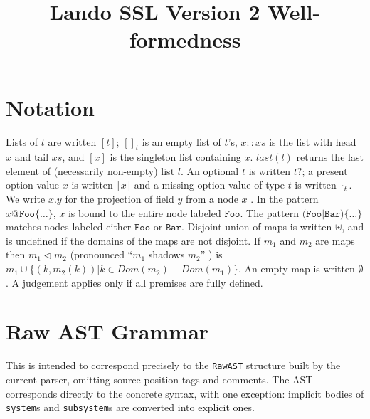 \documentclass{article}
\begin{document}
\title{Lando SSL Version 2 Well-formedness}
\maketitle

\section{Notation}

\newcommand{\nt}[1]{\ensuremath{\mathit{#1}}}
\newcommand{\lab}[1]{\ensuremath{\texttt{#1}}}
\newcommand{\listof}[1]{\ensuremath{[{#1}]}}
\newcommand{\nillist}[1]{[]_{#1}}
\newcommand{\conslist}[2]{{#1}::{#2}}
\newcommand{\singlelist}[1]{[{#1}]}
\newcommand{\listlast}[1]{\mathit{last}({#1})}
\newcommand{\optof}[1]{\ensuremath{{#1}?}}
\newcommand{\some}[1]{\lceil{#1}\rceil}
\newcommand{\none}[1]{\cdot_{#1}}
\newcommand{\proj}[2]{\ensuremath{{#1}.{#2}}}
\newcommand{\emptym}{\emptyset}
\newcommand{\shadow}{\vartriangleleft}

Lists of $t$ are written $\listof{t}$; $\nillist{t}$ is an empty list of $t$'s, $\conslist{x}{xs}$ is the list with head $x$ and tail $xs$,
and $\singlelist{x}$ is the singleton list containing $x$.
$\listlast{l}$ returns the last element of (necessarily non-empty) list $l$.
An optional $t$ is written $\optof{t}$; a present option value $x$ is written $\some{x}$ and a missing option value of type $t$ is written $\none{t}$.
We write $\proj{x}{y}$ for the projection of field $y$ from a node $x$ .
In the pattern $x@\lab{Foo}\{\ldots\}$, $x$ is bound to the entire node labeled $\lab{Foo}$.
The pattern $\lab{(Foo|Bar)}\{\ldots\}$ matches nodes labeled either $\lab{Foo}$ or $\lab{Bar}$.
Disjoint union of maps is written $\uplus$, and is undefined if the domains of the maps are not disjoint.
If $m_1$ and $m_2$ are maps then $m_1 \shadow m_2$ (pronounced ``$m_1$ shadows $m_2$'' ) is
$m_1 \cup \{(k,m_2(k)) | k \in Dom(m_2) - Dom(m_1)\}$.
An empty map is written $\emptym$.
A judgement applies only if all premises are fully defined.
\section{Raw AST Grammar}

This is intended to correspond precisely to the {\tt RawAST} structure built by the current parser, omitting source position tags
and comments. The AST corresponds directly to the concrete syntax, with one exception: implicit bodies of {\tt system}s and {\tt subsystem}s are
converted into explicit ones.
\end{document}
